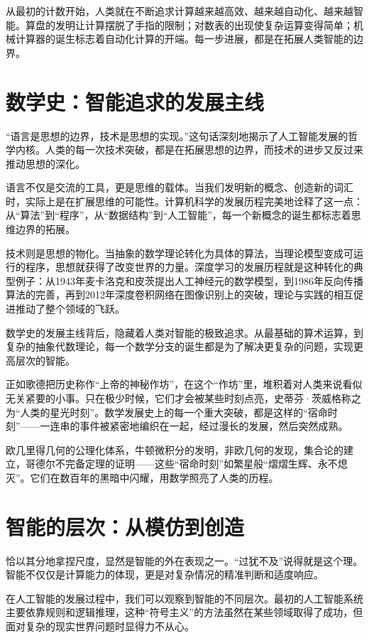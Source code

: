 从最初的计数开始，人类就在不断追求计算越来越高效、越来越自动化、越来越智能。算盘的发明让计算摆脱了手指的限制；对数表的出现使复杂运算变得简单；机械计算器的诞生标志着自动化计算的开端。每一步进展，都是在拓展人类智能的边界。

\section{数学史：智能追求的发展主线}

“语言是思想的边界，技术是思想的实现。”这句话深刻地揭示了人工智能发展的哲学内核。人类的每一次技术突破，都是在拓展思想的边界，而技术的进步又反过来推动思想的深化。

语言不仅是交流的工具，更是思维的载体。当我们发明新的概念、创造新的词汇时，实际上是在扩展思维的可能性。计算机科学的发展历程完美地诠释了这一点：从“算法”到“程序”，从“数据结构”到“人工智能”，每一个新概念的诞生都标志着思维边界的拓展。

技术则是思想的物化。当抽象的数学理论转化为具体的算法，当理论模型变成可运行的程序，思想就获得了改变世界的力量。深度学习的发展历程就是这种转化的典型例子：从1943年麦卡洛克和皮茨提出人工神经元的数学模型，到1986年反向传播算法的完善，再到2012年深度卷积网络在图像识别上的突破，理论与实践的相互促进推动了整个领域的飞跃。

数学史的发展主线背后，隐藏着人类对智能的极致追求。从最基础的算术运算，到复杂的抽象代数理论，每一个数学分支的诞生都是为了解决更复杂的问题，实现更高层次的智能。

正如歌德把历史称作“上帝的神秘作坊”，在这个“作坊”里，堆积着对人类来说看似无关紧要的小事。只在极少时候，它们才会被某些时刻点亮，史蒂芬·茨威格称之为“人类的星光时刻”。数学发展史上的每一个重大突破，都是这样的“宿命时刻”——一连串的事件被紧密地编织在一起，经过漫长的发展，然后突然成熟。

欧几里得几何的公理化体系，牛顿微积分的发明，非欧几何的发现，集合论的建立，哥德尔不完备定理的证明——这些“宿命时刻”如繁星般“熠熠生辉、永不熄灭”。它们在数百年的黑暗中闪耀，用数学照亮了人类的历程。

\section{智能的层次：从模仿到创造}

恰以其分地拿捏尺度，显然是智能的外在表现之一。“过犹不及”说得就是这个理。智能不仅仅是计算能力的体现，更是对复杂情况的精准判断和适度响应。

在人工智能的发展过程中，我们可以观察到智能的不同层次。最初的人工智能系统主要依靠规则和逻辑推理，这种“符号主义”的方法虽然在某些领域取得了成功，但面对复杂的现实世界问题时显得力不从心。

